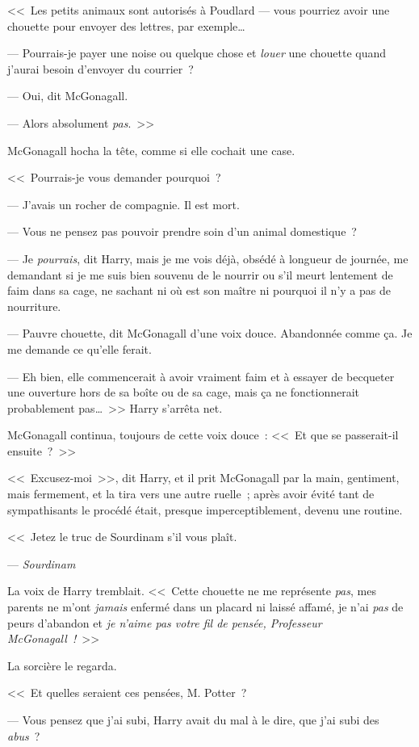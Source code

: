 <<~Les petits animaux sont autorisés à Poudlard — vous pourriez avoir une chouette pour envoyer des lettres, par exemple…

--- Pourrais-je payer une noise ou quelque chose et \emph{louer} une chouette quand j'aurai besoin d'envoyer du courrier~?

--- Oui, dit McGonagall.

--- Alors absolument \emph{pas}.~>>

McGonagall hocha la tête, comme si elle cochait une case. 

<<~Pourrais-je vous demander pourquoi~?

--- J'avais un rocher de compagnie. Il est mort.

--- Vous ne pensez pas pouvoir prendre soin d'un animal domestique~?

--- Je \emph{pourrais}, dit Harry, mais je me vois déjà, obsédé à longueur de journée, me demandant si je me suis bien souvenu de le nourrir ou s'il meurt lentement de faim dans sa cage, ne sachant ni où est son maître ni pourquoi il n'y a pas de nourriture.

--- Pauvre chouette, dit McGonagall d'une voix douce. Abandonnée comme ça. Je me demande ce qu'elle ferait.

--- Eh bien, elle commencerait à avoir vraiment faim et à essayer de becqueter une ouverture hors de sa boîte ou de sa cage, mais ça ne fonctionnerait probablement pas…~>> Harry s'arrêta net.

McGonagall continua, toujours de cette voix douce~: <<~Et que se passerait-il ensuite~?~>>

<<~Excusez-moi~>>, dit Harry, et il prit McGonagall par la main, gentiment, mais fermement, et la tira vers une autre ruelle~; après avoir évité tant de sympathisants le procédé était, presque imperceptiblement, devenu une routine.

<<~Jetez le truc de Sourdinam s'il vous plaît.

--- \emph{Sourdinam}

La voix de Harry tremblait. <<~Cette chouette ne me représente \emph{pas}, mes parents ne m'ont \emph{jamais} enfermé dans un placard ni laissé affamé, je n'ai \emph{pas} de peurs d'abandon et \emph{je n'aime pas votre fil de pensée, Professeur McGonagall~!}~>>

La sorcière le regarda.

<<~Et quelles seraient ces pensées, M. Potter~?

--- Vous pensez que j'ai subi, Harry avait du mal à le dire, que j'ai subi des \emph{abus}~?

